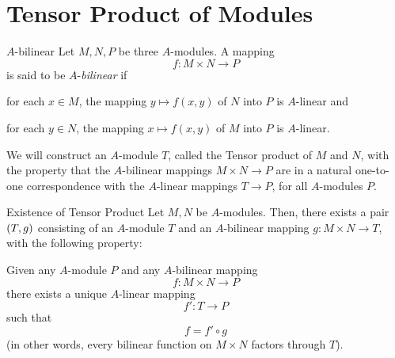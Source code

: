\pagebreak
\section{Tensor Product of Modules}

\begin{defn}{\(A\)-bilinear}{}
	Let \(M, N, P\) be three \(A\)-modules.
	A mapping
	\[
	f \colon M \times N \to P
	\]
	is said to be \(A\)-\emph{bilinear} if

	for each \(x \in M\), the mapping
	\(
	y \mapsto f(x, y)
	\)
	of \(N\) into \(P\) is \(A\)-linear and

	for each \(y \in N\), the mapping
	\(
	x \mapsto f(x, y)
	\)
	of \(M\) into \(P\) is \(A\)-linear.
\end{defn}

We will construct an \(A\)-module \(T\), called the Tensor product of
\(M\) and \(N\), with the property that the \(A\)-bilinear mappings
\(M \times N \to P\) are in a natural one-to-one correspondence with
the \(A\)-linear mappings \(T \to P\), for all \(A\)-modules \(P\).


\begin{proposition}{Existence of Tensor Product}{}
	Let \(M, N\) be \(A\)-modules.
	Then, there exists a pair \(\left( T, g \right)\) consisting of an \(A\)-module
	\(T\) and an \(A\)-bilinear mapping \(g \colon M \times N \to T\),
	with the following property:

	Given any \(A\)-module \(P\) and any \(A\)-bilinear mapping
	\[
		f \colon M \times N \to P
	\]
	there exists a unique \(A\)-linear mapping
	\[
		f' \colon T \to P
	\]
	such that
	\[
		f = f' \circ g
	\]
	(in other words, every bilinear function on \(M \times N\) factors
	through \(T\)).
\end{proposition}

